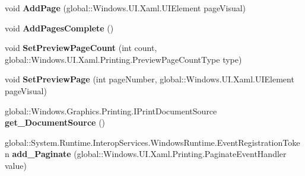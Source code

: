 \begin{DoxyCompactItemize}
\item 
\mbox{\label{interface_windows_1_1_u_i_1_1_xaml_1_1_printing_1_1_i_print_document_ade20244bcf646d2b02009597f231a389}} 
void {\bfseries Add\+Page} (global\+::\+Windows.\+U\+I.\+Xaml.\+U\+I\+Element page\+Visual)
\item 
\mbox{\label{interface_windows_1_1_u_i_1_1_xaml_1_1_printing_1_1_i_print_document_afd3c80952164c742e794be2817c23c65}} 
void {\bfseries Add\+Pages\+Complete} ()
\item 
\mbox{\label{interface_windows_1_1_u_i_1_1_xaml_1_1_printing_1_1_i_print_document_a3fad032cb5b86f827a5b5428c9ba1d34}} 
void {\bfseries Set\+Preview\+Page\+Count} (int count, global\+::\+Windows.\+U\+I.\+Xaml.\+Printing.\+Preview\+Page\+Count\+Type type)
\item 
\mbox{\label{interface_windows_1_1_u_i_1_1_xaml_1_1_printing_1_1_i_print_document_a2fb474592368092099efc8562a7c1bb6}} 
void {\bfseries Set\+Preview\+Page} (int page\+Number, global\+::\+Windows.\+U\+I.\+Xaml.\+U\+I\+Element page\+Visual)
\item 
\mbox{\label{interface_windows_1_1_u_i_1_1_xaml_1_1_printing_1_1_i_print_document_a42077e57d55ca55665d043d48da3ec8a}} 
global\+::\+Windows.\+Graphics.\+Printing.\+I\+Print\+Document\+Source {\bfseries get\+\_\+\+Document\+Source} ()
\item 
\mbox{\label{interface_windows_1_1_u_i_1_1_xaml_1_1_printing_1_1_i_print_document_a9dbc873132dc18654e2b7e972080c41e}} 
global\+::\+System.\+Runtime.\+Interop\+Services.\+Windows\+Runtime.\+Event\+Registration\+Token {\bfseries add\+\_\+\+Paginate} (global\+::\+Windows.\+U\+I.\+Xaml.\+Printing.\+Paginate\+Event\+Handler value)
\item 
\mbox{\label{interface_windows_1_1_u_i_1_1_xaml_1_1_printing_1_1_i_print_document_a799ea5a2c39144ec765078426a3efac8}} 

\end{DoxyCompactItemize}
